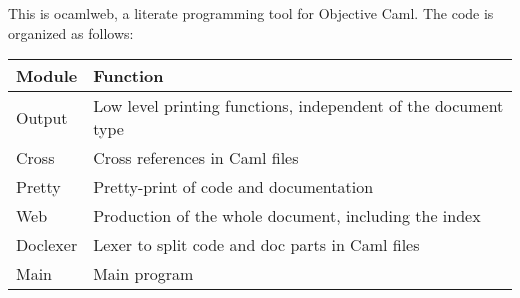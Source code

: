 
\newcommand{\ocamlweb}{\textsf{ocamlweb}}
\newcommand{\ocaml}{\textsf{Objective Caml}}

\noindent
This is \ocamlweb, a literate programming tool for \ocaml.
The code is organized as follows:

\begin{center}
\begin{tabular}{|l|l|}
  \hline
  \bf Module  &  \bf Function \\
  \hline\hline
  Output  &  Low level printing functions, independent of the document
  type \\
  \hline
  Cross   & Cross references in Caml files \\
  \hline
  Pretty  & Pretty-print of code and documentation \\
  \hline
  Web     & Production of the whole document, including the index \\
  \hline
  Doclexer& Lexer to split code and doc parts in Caml files \\
  \hline
  Main    & Main program \\
  \hline
\end{tabular}
\end{center}
